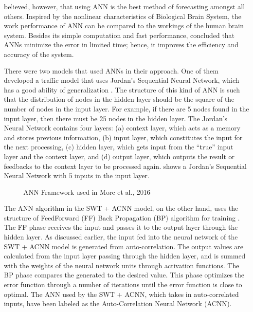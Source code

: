  believed, however, that using ANN is the best method of forecasting amongst all others. Inspired by the nonlinear characteristics of Biological Brain System, the work performance of ANN can be compared to the workings of the human brain system. Besides its simple computation and fast performance,  concluded that ANNs minimize the error in limited time; hence, it improves the efficiency and accuracy of the system. 

There were two models that used ANNs in their approach. One of them developed a traffic model that uses Jordan’s Sequential Neural Network, which has a good ability of generalization . The structure of this kind of ANN is such that the distribution of nodes in the hidden layer should be the square of the number of nodes in the input layer. For example, if there are 5 nodes found in the input layer, then there must be 25 nodes in the hidden layer. The Jordan’s Neural Network contains four layers: (a) context layer, which acts as a memory and stores previous information, (b) input layer, which constitutes the input for the next processing, (c) hidden layer, which gets input from the “true” input layer and the context layer, and (d) output layer, which outputs the result or feedbacks to the context layer to be processed again.  shows a Jordan’s Sequential Neural Network with 5 inputs in the input layer.

\begin{figure}[h]
	\centering
	\captionsetup{justification=centering}
	\caption{ANN Framework used in More et al., 2016}
	\label{fig:annJordan}
\end{figure}

The ANN algorithm in the SWT + ACNN model, on the other hand, uses the structure of FeedForward (FF) Back Propagation (BP) algorithm for training . The FF phase receives the input and passes it to the output layer through the hidden layer. As discussed earlier, the input fed into the neural network of the SWT + ACNN model is generated from auto-correlation. The output values are calculated from the input layer passing through the hidden layer, and is summed with the weights of the neural network units through activation functions. The BP phase compares the generated to the desired value. This phase optimizes the error function through a number of iterations until the error function is close to optimal. The ANN used by the SWT + ACNN, which takes in auto-correlated inputs, have been labeled as the Auto-Correlation Neural Network (ACNN).

